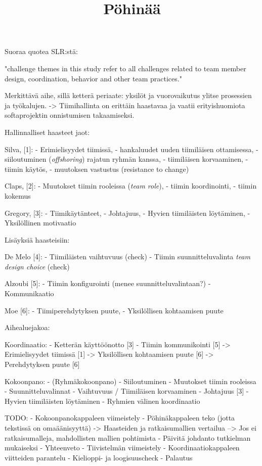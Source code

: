 \title{Pöhinää}

Suoraa quotea SLR:stä: 

"challenge themes in this study refer to all challenges related to team member design, coordination, behavior and other team practices."

Merkittävä aihe, sillä ketterä periaate: yksilöt ja vuorovaikutus ylitse prosessien ja työkalujen.
-> Tiimihallinta on erittäin haastavaa ja vaatii erityishuomiota softaprojektin onnistumisen takaamiseksi.


Hallinnalliset haasteet jaot:

Silva,      [1]: 
- Erimielisyydet tiimissä, 
- hankaluudet uuden tiimiläisen ottamisessa, 
- siiloutuminen (\textit{offshoring}) rajatun ryhmän kanssa, 
- tiimiläisen korvaaminen, 
- tiimin käytös, 
- muutoksen vastustus (resistance to change)

Claps,      [2]:
- Muutokset tiimin rooleissa (\textit{team role}), 
- tiimin koordinointi, 
- tiimin kokemus

Gregory,    [3]:
- Tiimikäytänteet,
- Johtajuus,
- Hyvien tiimiläisten löytäminen,
- Yksilöllinen motivaatio


Lisäyksiä haasteisiin:

De Melo     [4]:
- Tiimiläisten vaihtuvuus                               (check)
- Tiimin suunnitteluvalinta \textit{team design choice} (check)

Alzoubi     [5]:
- Tiimin konfigurointi (menee suunnitteluvalintaan?)
- Kommunikaatio

Moe         [6]:
- Tiimiperehdytyksen puute,
- Yksilöllisen kohtaamisen puute


Aihealuejakoa:

Koordinaatio:
- Ketterän käyttöönotto             [3]
- Tiimin kommunikointi              [5]
-> Erimielisyydet tiimissä          [1]
-> Yksilöllisen kohtaamisen puute   [6]
-> Perehdytyksen puute              [6]

Kokoonpano:
- (Ryhmäkokoonpano)
- Siiloutuminen
- Muutokset tiimin rooleissa
- Suunnitteluvalinnat
- Vaihtuvuus / Tiimiläisen korvaaminen
- Johtajuus [3]
- Hyvien tiimiläisten löytäminen
- Ryhmien välinen koordinaatio


TODO:
- Kokoonpanokappaleen viimeistely
- Pöhinäkappaleen teko (jotta tekstissä on omaäänisyyttä)
-> Haasteiden ja ratkaisumallien vertailua
--> Jos ei ratkaisumalleja, mahdollisten mallien pohtimista
- Päivitä johdanto tutkielman mukaiseksi
- Yhteenveto
- Tiivistelmän viimeistely
- Koordinaatiokappaleen viitteiden parantelu
- Kielioppi- ja loogisuuscheck
- Palautus
